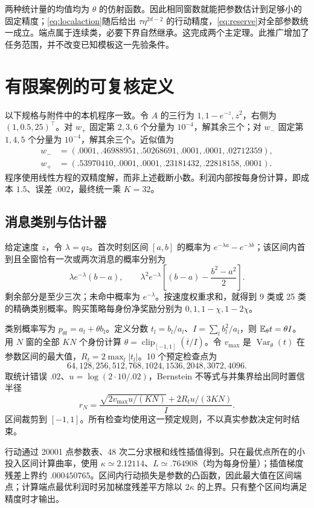 两种统计量的均值均为 $\theta$ 的仿射函数。因此相同窗数就能把参数估计到足够小的固定精度；\eqref{eq:localaction}随后给出 $\tau\eta^{2d-2}$ 的行动精度，\eqref{eq:reserve}对全部参数统一成立。端点属于连续类，必要下界自然继承。这完成两个主定理。此推广增加了任务范围，并不改变已知模板这一先验条件。

\section{有限案例的可复核定义}\label{app:case}
以下规格与附件中的本机程序一致。令 $A$ 的三行为 $1,1-e^{-z},z^2$，右侧为 $(1,0.5,25)^\top$。对 $w_+$ 固定第 $2,3,6$ 个分量为 $10^{-4}$，解其余三个；对 $w_-$ 固定第 $1,4,5$ 个分量为 $10^{-4}$，解其余三个。近似值为
\begin{align*}
 w_-&=(.0001,.46988951,.50268691,.0001,.0001,.02712359),\\
 w_+&=(.53970410,.0001,.0001,.23181432,.22818158,.0001).
\end{align*}
程序使用线性方程的双精度解，而非上述截断小数。利润内部按每身份计算，即成本 $1.5$、误差 $.002$，最终统一乘 $K=32$。

\subsection{消息类别与估计器}
给定速度 $z$，令 $\lambda=qz$。首次时刻区间 $[a,b]$ 的概率为 $e^{-\lambda a}-e^{-\lambda b}$；该区间内首到且全窗恰有一次或两次消息的概率分别为
\[
 \lambda e^{-\lambda}(b-a),\qquad
 \lambda^2e^{-\lambda}\left[(b-a)-\frac{b^2-a^2}2\right].
\]
剩余部分是至少三次；未命中概率为 $e^{-\lambda}$。按速度权重求和，就得到 9 类或 25 类的精确类别概率。购买策略每身份净奖励分别为 $0,1,1-\chi,1-2\chi$。

类别概率写为 $p_{\theta l}=a_l+\theta b_l$。定义分数 $t_l=b_l/a_l$、$I=\sum_l b_l^2/a_l$，则 $\mathbb E_\theta t=\theta I$。用 $N$ 窗的全部 $KN$ 个身份计算 $\widehat\theta=\operatorname{clip}_{[-1,1]}(\overline t/I)$。令 $v_{\max}$ 是 $\operatorname{Var}_\theta(t)$ 在参数区间的最大值，$R_t=2\max_l|t_l|$。10 个预定检查点为
\[
 64,128,256,512,768,1024,1536,2048,3072,4096.
\]
取统计错误 $.02$、$u=\log(2\cdot10/.02)$，Bernstein 不等式与并集界给出同时置信半径
\[
 r_N=\frac{\sqrt{2v_{\max}u/(KN)}+2R_tu/(3KN)}{I}.
\]
区间裁剪到 $[-1,1]$。所有检查均使用这一预定规则，不以真实参数决定何时结束。

行动通过 20001 点参数表、48 次二分求根和线性插值得到。只在最优点所在的小投入区间计算曲率，使用 $\kappa\simeq2.12114$、$L\simeq.764908$（均为每身份量）；插值梯度残差上界约 $.000450765$。区间内行动损失是参数的凸函数，因此最大值在区间端点；计算端点最优利润时另加梯度残差平方除以 $2\kappa$ 的上界。只有整个区间均满足精度时才输出。

